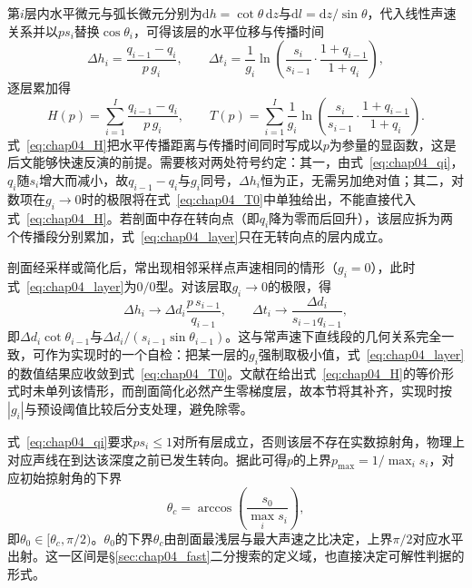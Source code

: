 第$i$层内水平微元与弧长微元分别为$\mathrm dh=\cot\theta\,\mathrm dz$与$\mathrm dl=\mathrm dz/\sin\theta$，代入线性声速关系并以$p s_i$替换$\cos\theta_i$，可得该层的水平位移与传播时间
\begin{equation}
 \Delta h_i=\frac{q_{i-1}-q_i}{p\,g_i},\qquad
 \Delta t_i=\frac{1}{g_i}\ln\left(\frac{s_i}{s_{i-1}}\cdot\frac{1+q_{i-1}}{1+q_i}\right),
\label{eq:chap04_layer}
\end{equation}
逐层累加得
\begin{equation}
 H(p)=\sum_{i=1}^{I}\frac{q_{i-1}-q_i}{p\,g_i},\qquad
 T(p)=\sum_{i=1}^{I}\frac{1}{g_i}\ln\left(\frac{s_i}{s_{i-1}}\cdot\frac{1+q_{i-1}}{1+q_i}\right).
\label{eq:chap04_H}
\end{equation}
式~\eqref{eq:chap04_H}把水平传播距离与传播时间同时写成以$p$为参量的显函数，这是后文能够快速反演的前提。需要核对两处符号约定：其一，由式~\eqref{eq:chap04_qi}，$q_i$随$s_i$增大而减小，故$q_{i-1}-q_i$与$g_i$同号，$\Delta h_i$恒为正，无需另加绝对值；其二，对数项在$g_i\to0$时的极限将在式~\eqref{eq:chap04_T0}中单独给出，不能直接代入式~\eqref{eq:chap04_H}。若剖面中存在转向点（即$q_i$降为零而后回升），该层应拆为两个传播段分别累加，式~\eqref{eq:chap04_layer}只在无转向点的层内成立。

剖面经采样或简化后，常出现相邻采样点声速相同的情形（$g_i=0$），此时式~\eqref{eq:chap04_layer}为$0/0$型。对该层取$g_i\to0$的极限，得
\begin{equation}
 \Delta h_i\to\Delta d_i\frac{p\,s_{i-1}}{q_{i-1}},\qquad
 \Delta t_i\to\frac{\Delta d_i}{s_{i-1}q_{i-1}},
\label{eq:chap04_T0}
\end{equation}
即$\Delta d_i\cot\theta_{i-1}$与$\Delta d_i/(s_{i-1}\sin\theta_{i-1})$。这与常声速下直线段的几何关系完全一致，可作为实现时的一个自检：把某一层的$g_i$强制取极小值，式~\eqref{eq:chap04_layer}的数值结果应收敛到式~\eqref{eq:chap04_T0}。文献在给出式~\eqref{eq:chap04_H}的等价形式时未单列该情形\cite{huangFastRaytracingbasedPrecise2024}，而剖面简化必然产生零梯度层，故本节将其补齐，实现时按$|g_i|$与预设阈值比较后分支处理，避免除零。

式~\eqref{eq:chap04_qi}要求$p s_i\le1$对所有层成立，否则该层不存在实数掠射角，物理上对应声线在到达该深度之前已发生转向。据此可得$p$的上界$p_{\max}=1/\max_i s_i$，对应初始掠射角的下界
\begin{equation}
 \theta_c=\arccos\left(\frac{s_0}{\max_i s_i}\right),
\label{eq:chap04_theta_c}
\end{equation}
即$\theta_0\in[\theta_c,\pi/2)$。$\theta_0$的下界$\theta_c$由剖面最浅层与最大声速之比决定，上界$\pi/2$对应水平出射。这一区间是\S\ref{sec:chap04_fast}二分搜索的定义域，也直接决定可解性判据的形式。

